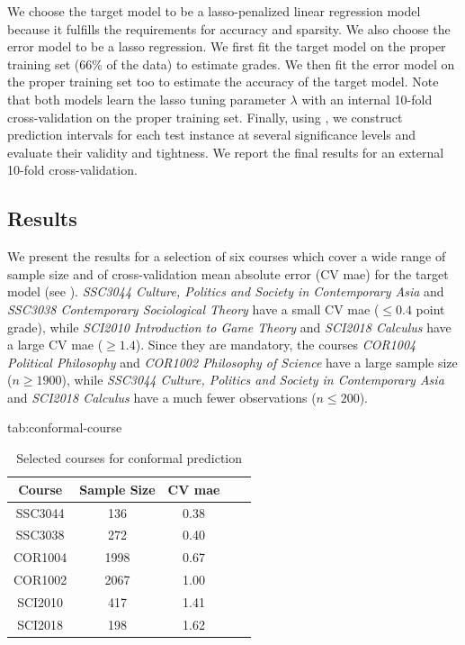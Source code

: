 \documentclass[pmlr]{jmlr}%
\begin{document}
We choose the target model to be a lasso-penalized linear regression model because it fulfills the requirements for accuracy and sparsity. We also choose the error model to be a lasso regression. We first fit the target model on the proper training set (66\% of the data) to estimate grades. We then fit the error model on the proper training set too to estimate the accuracy of the target model. Note that both models learn the lasso tuning parameter $\lambda$ with an internal 10-fold cross-validation on the proper training set. Finally, using , we construct prediction intervals for each test instance  at several significance levels and evaluate their validity and tightness. We report the final results for an external 10-fold cross-validation.

\subsection{Results}

We present the results for a selection of six courses which cover a wide range of sample size and of cross-validation mean absolute error (CV mae) for the target model (see ). \textit{SSC3044 Culture, Politics and Society in Contemporary Asia} and \textit{SSC3038 Contemporary Sociological Theory} have a small CV mae ($\le0.4$ point grade), while \textit{SCI2010 Introduction to Game Theory} and \textit{SCI2018 Calculus} have a large CV mae ($\ge1.4$). Since they are mandatory, the courses \textit{COR1004 Political Philosophy} and \textit{COR1002 Philosophy of Science} have a large sample size ($n\ge1900$), while \textit{SSC3044 Culture, Politics and Society in Contemporary Asia} and \textit{SCI2018 Calculus} have a much fewer observations ($n\le200$).

\begin{table}[hbtp]
	\floatconts
	{tab:conformal-course}
	{\caption{Selected courses for conformal prediction}}	
	{\begin{tabular}{ccccc}
			\toprule
			\bfseries Course &\bfseries Sample Size &\bfseries CV mae \\
			\midrule
			SSC3044 & 136  & 0.38\\
			SSC3038 & 272  & 0.40\\
			COR1004 & 1998 & 0.67\\
			COR1002 & 2067 & 1.00\\
			SCI2010 & 417  & 1.41\\
			SCI2018 & 198  & 1.62\\
			\bottomrule
	\end{tabular}}	
\end{table}
\end{document}

